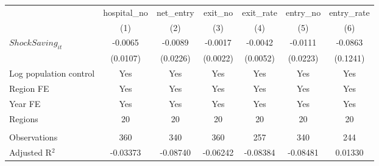 \begingroup
\centering
\begin{tabular}{lcccccc}
   \toprule
                          & hospital\_no  & net\_entry  & exit\_no  & exit\_rate  & entry\_no  & entry\_rate \\    
                          & (1)           & (2)         & (3)       & (4)         & (5)        & (6)\\  
   \midrule 
   $ShockSaving_{it}$     & -0.0065       & -0.0089     & -0.0017   & -0.0042     & -0.0111    & -0.0863\\   
                          & (0.0107)      & (0.0226)    & (0.0022)  & (0.0052)    & (0.0223)   & (0.1241)\\   
   Log population control & Yes           & Yes         & Yes       & Yes         & Yes        & Yes\\  
   Region FE              & Yes           & Yes         & Yes       & Yes         & Yes        & Yes\\  
   Year FE                & Yes           & Yes         & Yes       & Yes         & Yes        & Yes\\  
   Regions                & 20            & 20          & 20        & 20          & 20         & 20\\  
    \\
   Observations           & 360           & 340         & 360       & 257         & 340        & 244\\  
   Adjusted R$^2$         & -0.03373      & -0.08740    & -0.06242  & -0.08384    & -0.08481   & 0.01330\\  
   \bottomrule
\end{tabular}
\par\endgroup
